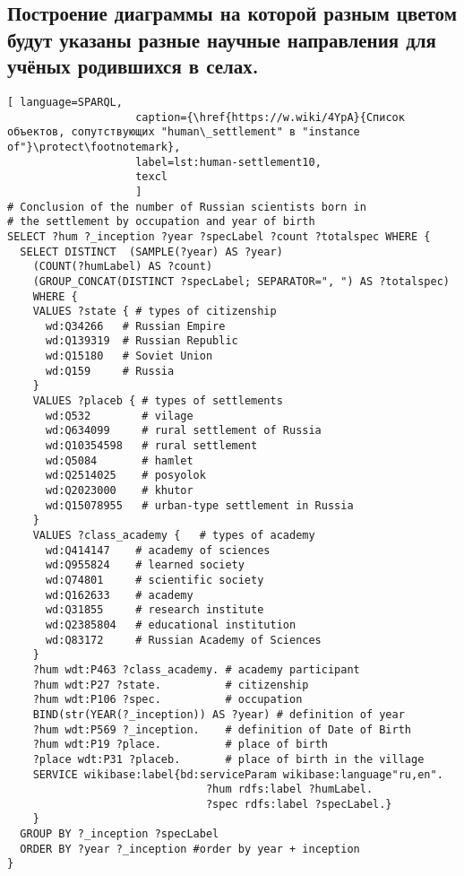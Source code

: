 \subsection{Построение диаграммы на которой разным цветом будут указаны разные научные направления для учёных родившихся в селах.}

\lstset{numbers=left, firstnumber=1, frame=single}
\begin{lstlisting}[ language=SPARQL, 
                    caption={\href{https://w.wiki/4YpA}{Cписок объектов, сопутствующих "human\_settlement" в "instance of"}\protect\footnotemark},
                    label=lst:human-settlement10,
                    texcl 
                    ]
# Conclusion of the number of Russian scientists born in 
# the settlement by occupation and year of birth
SELECT ?hum ?_inception ?year ?specLabel ?count ?totalspec WHERE {
  SELECT DISTINCT  (SAMPLE(?year) AS ?year) 
	(COUNT(?humLabel) AS ?count)  
	(GROUP_CONCAT(DISTINCT ?specLabel; SEPARATOR=", ") AS ?totalspec) 
	WHERE {
    VALUES ?state { # types of citizenship
      wd:Q34266   # Russian Empire 
      wd:Q139319  # Russian Republic
      wd:Q15180   # Soviet Union
      wd:Q159     # Russia
    }
    VALUES ?placeb { # types of settlements
      wd:Q532        # vilage
      wd:Q634099     # rural settlement of Russia
      wd:Q10354598   # rural settlement
      wd:Q5084       # hamlet
      wd:Q2514025    # posyolok
      wd:Q2023000    # khutor
      wd:Q15078955   # urban-type settlement in Russia
    }
    VALUES ?class_academy {   # types of academy
      wd:Q414147    # academy of sciences 
      wd:Q955824    # learned society
      wd:Q74801     # scientific society
      wd:Q162633    # academy
      wd:Q31855     # research institute
      wd:Q2385804   # educational institution
      wd:Q83172     # Russian Academy of Sciences
    }
    ?hum wdt:P463 ?class_academy. # academy participant
    ?hum wdt:P27 ?state.          # citizenship
    ?hum wdt:P106 ?spec.          # occupation
    BIND(str(YEAR(?_inception)) AS ?year) # definition of year
    ?hum wdt:P569 ?_inception.    # definition of Date of Birth
    ?hum wdt:P19 ?place.          # place of birth
    ?place wdt:P31 ?placeb.       # place of birth in the village
    SERVICE wikibase:label{bd:serviceParam wikibase:language"ru,en".
                               ?hum rdfs:label ?humLabel.
                               ?spec rdfs:label ?specLabel.}
    }
  GROUP BY ?_inception ?specLabel
  ORDER BY ?year ?_inception #order by year + inception
}
\end{lstlisting}%

